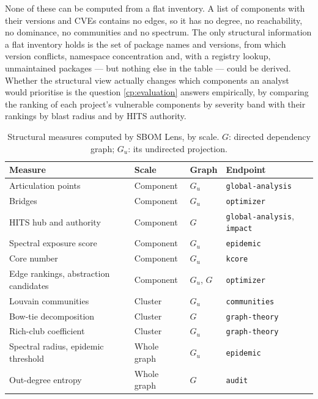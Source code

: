 None of these can be computed from a flat inventory. A list of components with their versions and CVEs contains no edges, so it has no degree, no reachability, no dominance, no communities and no spectrum. The only structural information a flat inventory holds is the set of package names and versions, from which version conflicts, namespace concentration and, with a registry lookup, unmaintained packages --- but nothing else in the table --- could be derived. Whether the structural view actually changes which components an analyst would prioritise is the question \autoref{cp:evaluation} answers empirically, by comparing the ranking of each project's vulnerable components by severity band with their rankings by blast radius and by HITS authority.

\begin{table}[!htpb]
    \centering
    \small
    \caption[Structural measures computed by SBOM Lens]{Structural measures computed by SBOM Lens, by scale. \(G\): directed dependency graph; \(G_u\): its undirected projection.}
    \label{tab:ns-summary}
    \begin{tabular}{lllp{3.2cm}}
        \toprule
        \textbf{Measure} & \textbf{Scale} & \textbf{Graph} & \textbf{Endpoint} \\
        \midrule
        Articulation points & Component & \(G_u\) & \texttt{global-analysis} \\
        Bridges & Component & \(G_u\) & \texttt{optimizer} \\
        HITS hub and authority & Component & \(G\) & \texttt{global-analysis}, \texttt{impact} \\
        Spectral exposure score & Component & \(G_u\) & \texttt{epidemic} \\
        Core number & Component & \(G_u\) & \texttt{kcore} \\
        Edge rankings, abstraction candidates & Component & \(G_u\), \(G\) & \texttt{optimizer} \\
        Louvain communities & Cluster & \(G_u\) & \texttt{communities} \\
        Bow-tie decomposition & Cluster & \(G\) & \texttt{graph-theory} \\
        Rich-club coefficient & Cluster & \(G_u\) & \texttt{graph-theory} \\
        Spectral radius, epidemic threshold & Whole graph & \(G_u\) & \texttt{epidemic} \\
        Out-degree entropy & Whole graph & \(G\) & \texttt{audit} \\

\end{tabular}
\end{table}
